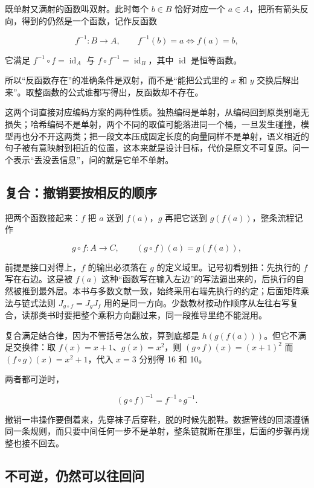 既单射又满射的函数叫双射。此时每个 \(b\in B\) 恰好对应一个 \(a\in A\)，把所有箭头反向，得到的仍然是一个函数，记作反函数

\[
f^{-1}:B\to A,\qquad
f^{-1}(b)=a\Longleftrightarrow f(a)=b,
\]

它满足 \(f^{-1}\circ f=\operatorname{id}_{A}\) 与 \(f\circ f^{-1}=\operatorname{id}_{B}\)，其中 \(\operatorname{id}\) 是恒等函数。

所以``反函数存在''的准确条件是双射，而不是``能把公式里的 \(x\) 和 \(y\) 交换后解出来''。取整函数的公式谁都写得出，反函数却不存在。

这两个词直接对应编码方案的两种性质。独热编码是单射，从编码回到原类别毫无损失；哈希编码不是单射，两个不同的取值可能落进同一个桶，一旦发生碰撞，模型再也分不开这两类；把一段文本压成固定长度的向量同样不是单射，语义相近的句子被有意映射到相近的位置，这本来就是设计目标，代价是原文不可复原。问一个表示``丢没丢信息''，问的就是它单不单射。

\subsection{复合：撤销要按相反的顺序}

把两个函数接起来：\(f\) 把 \(a\) 送到 \(f(a)\)，\(g\) 再把它送到 \(g(f(a))\)，整条流程记作

\[
g\circ f:A\to C,\qquad(g\circ f)(a)=g(f(a)),
\]

前提是接口对得上，\(f\) 的输出必须落在 \(g\) 的定义域里。记号初看别扭：先执行的 \(f\) 写在右边。这是被 \(f(a)\) 这种``函数写在输入左边''的写法逼出来的，后执行的自然被推到最外层。本书与多数文献一致，始终采用右端先执行的约定；后面矩阵乘法与链式法则 \(J_{g\circ f}=J_{g}J_{f}\) 用的是同一方向。少数教材按动作顺序从左往右写复合，读那类书时要把整个乘积方向翻过来，同一段推导里绝不能混用。

复合满足结合律，因为不管括号怎么放，算到底都是 \(h(g(f(a)))\)。但它不满足交换律：取 \(f(x)=x+1\)、\(g(x)=x^{2}\)，则 \((g\circ f)(x)=(x+1)^{2}\) 而 \((f\circ g)(x)=x^{2}+1\)，代入 \(x=3\) 分别得 16 和 10。

两者都可逆时，

\[
(g\circ f)^{-1}=f^{-1}\circ g^{-1}.
\]

撤销一串操作要倒着来，先穿袜子后穿鞋，脱的时候先脱鞋。数据管线的回滚遵循同一条规则，而只要中间任何一步不是单射，整条链就断在那里，后面的步骤再规整也接不回去。

\subsection{不可逆，仍然可以往回问}


